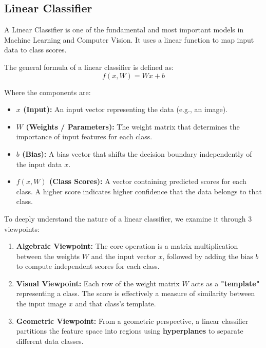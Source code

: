 \documentclass[12pt,a4paper]{report}
\begin{document}
\subsection{Linear Classifier}

A Linear Classifier is one of the fundamental and most important models in Machine Learning and Computer Vision. It uses a linear function to map input data to class scores.

The general formula of a linear classifier is defined as:
\begin{equation}
    f(x, W) = Wx + b
\end{equation}

Where the components are:
\begin{itemize}
    \item \textbf{$x$ (Input):} An input vector representing the data (e.g., an image).
    \item \textbf{$W$ (Weights / Parameters):} The weight matrix that determines the importance of input features for each class.
    \item \textbf{$b$ (Bias):} A bias vector that shifts the decision boundary independently of the input data $x$.
    \item \textbf{$f(x, W)$ (Class Scores):} A vector containing predicted scores for each class. A higher score indicates higher confidence that the data belongs to that class.
\end{itemize}

To deeply understand the nature of a linear classifier, we examine it through 3 viewpoints:

\begin{enumerate}
    \item \textbf{Algebraic Viewpoint:}
    The core operation is a matrix multiplication between the weights $W$ and the input vector $x$, followed by adding the bias $b$ to compute independent scores for each class.
    
    \item \textbf{Visual Viewpoint:}
    Each row of the weight matrix $W$ acts as a \textbf{"template"} representing a class. The score is effectively a measure of similarity between the input image $x$ and that class's template.
    
    \item \textbf{Geometric Viewpoint:}
    From a geometric perspective, a linear classifier partitions the feature space into regions using \textbf{hyperplanes} to separate different data classes.
\end{enumerate}
\end{document}

